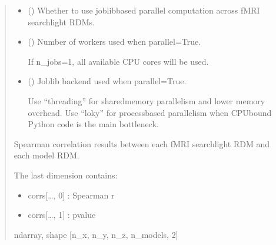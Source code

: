 \documentclass[letterpaper,10pt,english]{sphinxhowto}
\begin{document}
\begin{fulllineitems}
\begin{quote}
\begin{description}
\begin{itemize}
\sphinxAtStartPar
n\_x, n\_y, and n\_z represent the number of searchlight units along
the x, y, and z axes.


\item {} 
\sphinxAtStartPar
{} (\sphinxstyleliteralemphasis{\sphinxupquote{, }}) \textendash{} Whether to use joblib\sphinxhyphen{}based parallel computation across fMRI searchlight RDMs.

\item {} 
\sphinxAtStartPar
{} (\sphinxstyleliteralemphasis{\sphinxupquote{, }}) \textendash{} 
\sphinxAtStartPar
Number of workers used when parallel=True.

\sphinxAtStartPar
If n\_jobs=\sphinxhyphen{}1, all available CPU cores will be used.


\item {} 
\sphinxAtStartPar
{} (\sphinxstyleliteralemphasis{\sphinxupquote{, }}\sphinxstyleliteralemphasis{\sphinxupquote{, }}) \textendash{} 
\sphinxAtStartPar
Joblib backend used when parallel=True.

\sphinxAtStartPar
Use “threading” for shared\sphinxhyphen{}memory parallelism and lower memory overhead.
Use “loky” for process\sphinxhyphen{}based parallelism when CPU\sphinxhyphen{}bound Python code is
the main bottleneck.


\end{itemize}

\sphinxAtStartPar

\sphinxAtStartPar
{} \textendash{} Spearman correlation results between each fMRI searchlight RDM and
each model RDM.

\sphinxAtStartPar
The last dimension contains:
\begin{itemize}
\item {} 
\sphinxAtStartPar
corrs{[}…, 0{]} : Spearman r

\item {} 
\sphinxAtStartPar
corrs{[}…, 1{]} : p\sphinxhyphen{}value

\end{itemize}


\sphinxAtStartPar
ndarray, shape {[}n\_x, n\_y, n\_z, n\_models, 2{]}

\end{description}\end{quote}

\end{fulllineitems}
\end{document}
